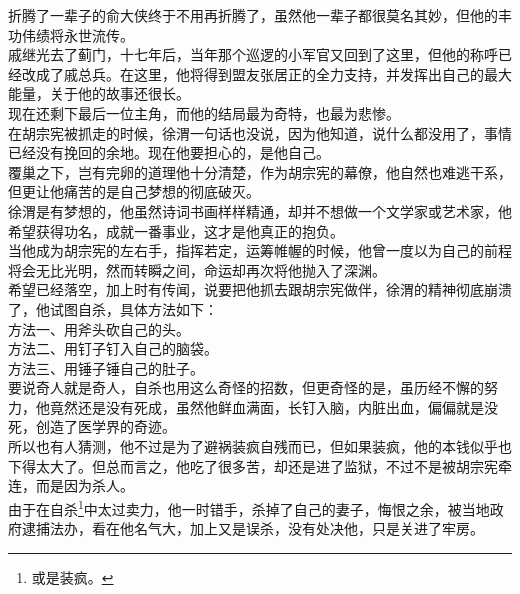 \begin{multicols}{\theparacolNo}
折腾了一辈子的俞大侠终于不用再折腾了，虽然他一辈子都很莫名其妙，但他的丰功伟绩将永世流传。\\

戚继光去了蓟门，十七年后，当年那个巡逻的小军官又回到了这里，但他的称呼已经改成了戚总兵。在这里，他将得到盟友张居正的全力支持，并发挥出自己的最大能量，关于他的故事还很长。\\

现在还剩下最后一位主角，而他的结局最为奇特，也最为悲惨。\\

在胡宗宪被抓走的时候，徐渭一句话也没说，因为他知道，说什么都没用了，事情已经没有挽回的余地。现在他要担心的，是他自己。\\

覆巢之下，岂有完卵的道理他十分清楚，作为胡宗宪的幕僚，他自然也难逃干系，但更让他痛苦的是自己梦想的彻底破灭。\\

徐渭是有梦想的，他虽然诗词书画样样精通，却并不想做一个文学家或艺术家，他希望获得功名，成就一番事业，这才是他真正的抱负。\\

当他成为胡宗宪的左右手，指挥若定，运筹帷幄的时候，他曾一度以为自己的前程将会无比光明，然而转瞬之间，命运却再次将他抛入了深渊。\\

希望已经落空，加上时有传闻，说要把他抓去跟胡宗宪做伴，徐渭的精神彻底崩溃了，他试图自杀，具体方法如下：\\

方法一、用斧头砍自己的头。\\

方法二、用钉子钉入自己的脑袋。\\

方法三、用锤子锤自己的肚子。\\

要说奇人就是奇人，自杀也用这么奇怪的招数，但更奇怪的是，虽历经不懈的努力，他竟然还是没有死成，虽然他鲜血满面，长钉入脑，内脏出血，偏偏就是没死，创造了医学界的奇迹。\\

所以也有人猜测，他不过是为了避祸装疯自残而已，但如果装疯，他的本钱似乎也下得太大了。但总而言之，他吃了很多苦，却还是进了监狱，不过不是被胡宗宪牵连，而是因为杀人。\\

由于在自杀\footnote{或是装疯。}中太过卖力，他一时错手，杀掉了自己的妻子，悔恨之余，被当地政府逮捕法办，看在他名气大，加上又是误杀，没有处决他，只是关进了牢房。\\


\end{multicols}
